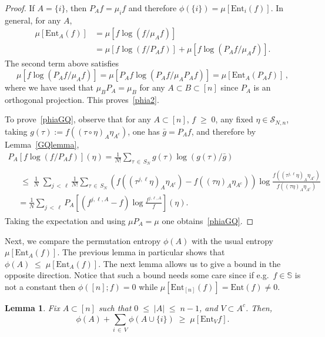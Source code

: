 \documentclass[10pt,a4paper]{amsart}
\renewcommand{\leq}{\;\leqslant\;}
\renewcommand{\geq}{\;\geqslant\;}
\newcommand{\ent}{\mathrm{Ent}}
\newcommand{\cS}{\mathcal{S}}
\newcommand{\bbS}{\mathbb{S}}
\let\t=\tau
\newtheorem{lemm}[theo]{Lemma}
\theoremstyle{definition}
\theoremstyle{plain}
\numberwithin{equation}{section}
\begin{document}
\begin{proof}
If $A=\{i\}$, then $P_A f = \mu_i f$ and therefore $\phi(\{i\}) = \mu\left[\ent_i(f)\right]$. In general, for any $A$,
\begin{align*}
\mu\left[\ent_A(f) \right]&= \mu\left[f\log(f/\mu_Af)\right] \\
& =\mu\left[f\log(f/P_Af)\right] + \mu\left[f\log(P_Af/\mu_Af)\right].
\end{align*}
The second term above satisfies
\[
\mu\left[f\log(P_Af/\mu_Af)\right]= \mu\left[P_A f\log(P_Af/\mu_A P_Af)\right] = \mu\left[\ent_A(P_Af) \right] \,,
\]
where we have used that $\mu_BP_A=\mu_B$ for any $A\subset B\subset[n]$ since $P_A$ is an orthogonal projection. This proves~\eqref{phia2}.

To prove~\eqref{phiaGQ}, observe that for any $A\subset [n]$, $f\geq 0$, any fixed $\eta\in\cS_{N,n}$, taking $g(\t):=f((\t\circ\eta)_A\eta_{A^c})$, one has $\bar g = P_Af$, and therefore by Lemma~\ref{GQlemma},
\begin{multline*}
P_A\left[f\log(f/P_Af)\right] (\eta)=\frac1{N!}\sum_{\t\,\in\,S_N} g(\t)\log(g(\t)/\bar g)\\
\begin{aligned}
&\leq \frac1N\;\sum_{j\,<\,\ell}\frac1{N!}\sum_{\t\,\in\,S_N}\left(f\left((\t^{j,\ell}\eta)_A\eta_{A^c}\right) - f\left((\t\eta)_A\eta_{A^c}\right)\right)\log \frac{f\left((\t^{j,\ell}\eta)_A\eta_{A^c}\right)}{f\left((\t\eta)_A\eta_{A^c}\right)}
\\&=
\frac1N\sum_{j\,<\,\ell}P_A\left[\left(f^{j,\ell,A} - f\right)\log \frac{f^{j,\ell,A}}f
\right](\eta).
\end{aligned}
\end{multline*}
Taking the expectation and using $\mu P_A=\mu$ one obtains~\eqref{phiaGQ}.
\end{proof}

Next, we compare the permutation entropy $\phi(A)$ with the usual entropy $\mu[\ent_A(f) ]$. The previous lemma in particular shows that $\phi(A)\leq \mu[\ent_A(f) ]$. The next lemma allows us to give a bound in the opposite direction. Notice that such a bound needs some care since if e.g.\ $f\in\bbS$ is not a constant then $\phi([n];f)=0$ while $\mu[\ent_{[n]}(f) ]=\ent(f)\neq 0$.

\begin{lemm}\label{keyphi}
Fix $A\subset [n]$ such that $0\leq |A|\leq n-1$, and $V\subset A^c$. Then,
\begin{equation}\label{phia5}
\phi(A) + \sum_{i\,\in\,V}\phi(A\cup\{i\})\geq \mu\left[\ent_{V}f \right].
\end{equation}
\end{lemm}
\end{document}
